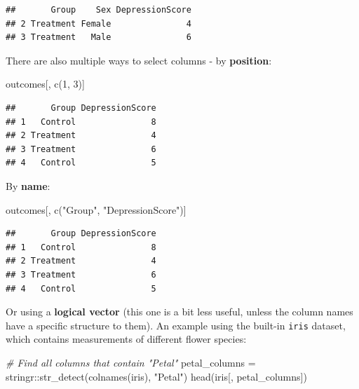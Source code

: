 \documentclass[
]{book}
\newenvironment{Shaded}{\begin{snugshade}}{\end{snugshade}}
\newcommand{\CommentTok}[1]{\textcolor[rgb]{0.56,0.35,0.01}{\textit{#1}}}
\newcommand{\DecValTok}[1]{\textcolor[rgb]{0.00,0.00,0.81}{#1}}
\newcommand{\FunctionTok}[1]{\textcolor[rgb]{0.00,0.00,0.00}{#1}}
\newcommand{\NormalTok}[1]{#1}
\newcommand{\OtherTok}[1]{\textcolor[rgb]{0.56,0.35,0.01}{#1}}
\newcommand{\SpecialCharTok}[1]{\textcolor[rgb]{0.00,0.00,0.00}{#1}}
\newcommand{\StringTok}[1]{\textcolor[rgb]{0.31,0.60,0.02}{#1}}
\begin{document}
\begin{Shaded}
\end{Shaded}

\begin{verbatim}
##       Group    Sex DepressionScore
## 2 Treatment Female               4
## 3 Treatment   Male               6
\end{verbatim}

There are also multiple ways to select columns - by \textbf{position}:

\begin{Shaded}
\begin{Highlighting}[]
\NormalTok{outcomes[, }\FunctionTok{c}\NormalTok{(}\DecValTok{1}\NormalTok{, }\DecValTok{3}\NormalTok{)]}
\end{Highlighting}
\end{Shaded}

\begin{verbatim}
##       Group DepressionScore
## 1   Control               8
## 2 Treatment               4
## 3 Treatment               6
## 4   Control               5
\end{verbatim}

By \textbf{name}:

\begin{Shaded}
\begin{Highlighting}[]
\NormalTok{outcomes[, }\FunctionTok{c}\NormalTok{(}\StringTok{"Group"}\NormalTok{, }\StringTok{"DepressionScore"}\NormalTok{)]}
\end{Highlighting}
\end{Shaded}

\begin{verbatim}
##       Group DepressionScore
## 1   Control               8
## 2 Treatment               4
## 3 Treatment               6
## 4   Control               5
\end{verbatim}

Or using a \textbf{logical vector} (this one is a bit less useful, unless the column
names have a specific structure to them). An example using the built-in
\texttt{iris} dataset, which contains measurements of different flower species:

\begin{Shaded}
\begin{Highlighting}[]
\CommentTok{\# Find all columns that contain "Petal"}
\NormalTok{petal\_columns }\OtherTok{=}\NormalTok{ stringr}\SpecialCharTok{::}\FunctionTok{str\_detect}\NormalTok{(}\FunctionTok{colnames}\NormalTok{(iris), }\StringTok{"Petal"}\NormalTok{)}
\FunctionTok{head}\NormalTok{(iris[, petal\_columns])}
\end{Highlighting}
\end{Shaded}
\end{document}
